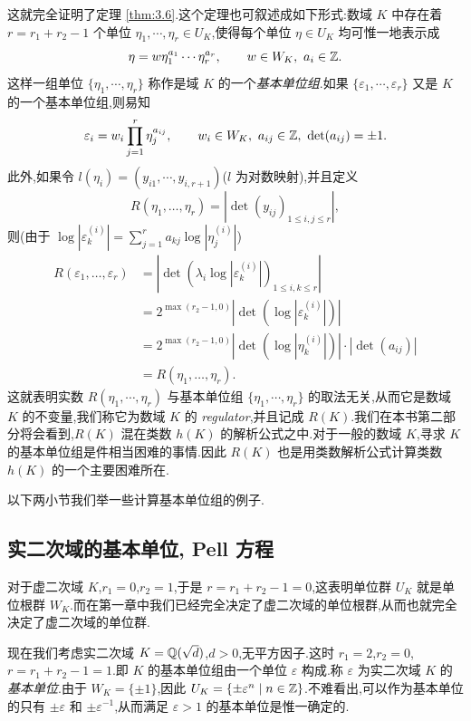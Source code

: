 \begin{sloppypar}
这就完全证明了定理 \ref{thm:3.6}.这个定理也可叙述成如下形式:数域 $K$ 中存在着 $r=r_1+r_2-1$ 个单位 $\eta_1,\cdots,\eta_r\in U_K$,使得每个单位 $\eta\in U_K$ 均可惟一地表示成
\[
  \eta=w\eta_1^{a_1}\cdots\eta_r^{a_r},\qquad w\in W_K,\ a_i\in\mathbb{Z}.
\]
这样一组单位 $\{\eta_1,\cdots,\eta_r\}$ 称作是域 $K$ 的一个\emph{基本单位组}.如果 $\{\varepsilon_1,\cdots,\varepsilon_r\}$ 又是 $K$ 的一个基本单位组,则易知
\[
  \varepsilon_i=w_i\prod_{j=1}^{r}\eta_j^{a_{ij}},\qquad w_i\in W_K,\ a_{ij}\in\mathbb{Z},\ \det(a_{ij})=\pm 1.
\]
此外,如果令 $l(\eta_i)=(y_{i1},\cdots,y_{i,r+1})$($l$ 为对数映射),并且定义
\[
  R(\eta_1,\dots,\eta_r)=|\det(y_{ij})_{1\leqslant i,j\leqslant r}|,
\]
则(由于 $\log|\varepsilon_k^{(i)}|=\sum_{j=1}^{r}a_{kj}\log|\eta_j^{(i)}|$)
\begin{align*}
  R(\varepsilon_1,\dots,\varepsilon_r)
  &=|\det(\lambda_i\log|\varepsilon_k^{(i)}|)_{1\leqslant i,k\leqslant r}|\\
  &=2^{\max(r_2-1,0)}|\det(\log|\varepsilon_k^{(i)}|)|\\
  &=2^{\max(r_2-1,0)}|\det(\log|\eta_k^{(i)}|)|\cdot|\det(a_{ij})|\\
  &=R(\eta_1,\dots,\eta_r).
\end{align*}
这就表明实数 $R(\eta_1,\cdots,\eta_r)$ 与基本单位组 $\{\eta_1,\cdots,\eta_r\}$ 的取法无关,从而它是数域 $K$ 的不变量,我们称它为数域 $K$ 的 \emph{regulator},并且记成 $R(K)$.我们在本书第二部分将会看到,$R(K)$ 混在类数 $h(K)$ 的解析公式之中.对于一般的数域 $K$,寻求 $K$ 的基本单位组是件相当困难的事情.因此 $R(K)$ 也是用类数解析公式计算类数 $h(K)$ 的一个主要困难所在.
\end{sloppypar}

以下两小节我们举一些计算基本单位组的例子.

\subsection{实二次域的基本单位, Pell 方程}\label{sec:ch3-s2-2}

对于虚二次域 $K$,$r_1=0$,$r_2=1$,于是 $r=r_1+r_2-1=0$,这表明单位群 $U_K$ 就是单位根群 $W_K$.而在第一章中我们已经完全决定了虚二次域的单位根群,从而也就完全决定了虚二次域的单位群.

现在我们考虑实二次域 $K=\mathbb{Q}(\sqrt{d})$,$d>0$,无平方因子.这时 $r_1=2$,$r_2=0$,$r=r_1+r_2-1=1$.即 $K$ 的基本单位组由一个单位 $\varepsilon$ 构成.称 $\varepsilon$ 为实二次域 $K$ 的\emph{基本单位}.由于 $W_K=\{\pm1\}$,因此 $U_K=\{\pm\varepsilon^n\mid n\in\mathbb{Z}\}$.不难看出,可以作为基本单位的只有 $\pm\varepsilon$ 和 $\pm\varepsilon^{-1}$,从而满足 $\varepsilon>1$ 的基本单位是惟一确定的.

